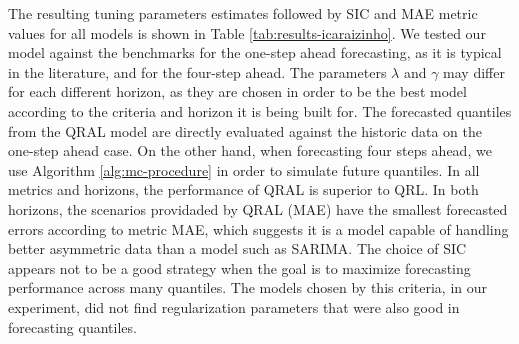The resulting tuning parameters estimates followed by SIC and MAE metric values for all models is shown in Table \ref{tab:results-icaraizinho}. We tested our model against the benchmarks for the one-step ahead forecasting, as it is typical in the literature, and for the four-step ahead. The parameters $\lambda$ and $\gamma$ may differ for each different horizon, as they are chosen in order to be the best model according to the criteria and horizon it is being built for. The forecasted quantiles from the QRAL model are directly evaluated against the historic data on the one-step ahead case. On the other hand, when forecasting four steps ahead, we use Algorithm \ref{alg:mc-procedure} in order to simulate future quantiles.
In all metrics and horizons, the performance of QRAL is superior to QRL. In both horizons, the scenarios providaded by QRAL (MAE) have the smallest forecasted errors according to metric MAE, which suggests it is a model capable of handling better asymmetric data than a model such as SARIMA. The choice of SIC appears not to be a good strategy when the goal is to maximize forecasting performance across many quantiles. The models chosen by this criteria, in our experiment, did not find regularization parameters that were also good in forecasting quantiles.
